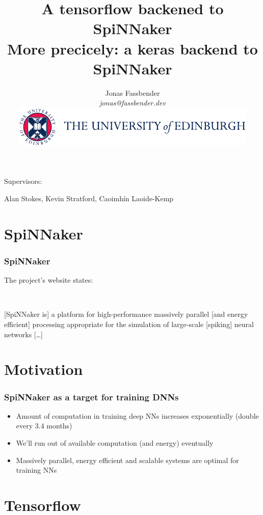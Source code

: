\documentclass[xcolor=x11names,compress,usenames,dvipsnames,mathsans]{beamer}
\title[GitLab demo]{A tensorflow backened to SpiNNaker \\
  More precicely: a keras backend to SpiNNaker}
\author[author]{Jonas Fassbender \\
\textit{jonas@fassbender.dev} \\
\vspace{1em}
\includegraphics[scale=.8]{logo_colour.pdf}
} %
\date{}
\begin{document}
\begin{frame}
  \titlepage
  \vspace{-2cm}

  \begin{center}
  Supervisors:

  Alan Stokes, Kevin Stratford, Caoimhín Laoide-Kemp
  \end{center}
\end{frame}

\section{SpiNNaker}

\begin{frame}[fragile]
  \frametitle{SpiNNaker}

  The project's website \cite{spinnaker_project} states:

  \textcolor{white}{bad workaround}

  [SpiNNaker is] a platform for high-performance massively
  parallel [and energy efficient] processing appropriate
  for the simulation of large-scale [spiking] neural
  networks [\dots]

\end{frame}

\section{Motivation}

\begin{frame}[fragile]
  \frametitle{SpiNNaker as a target for training DNNs}

  \begin{itemize}[<+->]
    \item Amount of computation in training deep NNs
          increases exponentially (double every 3.4 months)
          \cite{openai2019}
    \item We'll run out of available computation (and
          energy) eventually
    \item Massively parallel, energy efficient and scalable
          systems are optimal for training NNs
  \end{itemize}
\end{frame}

\section{Tensorflow}
\end{document}
